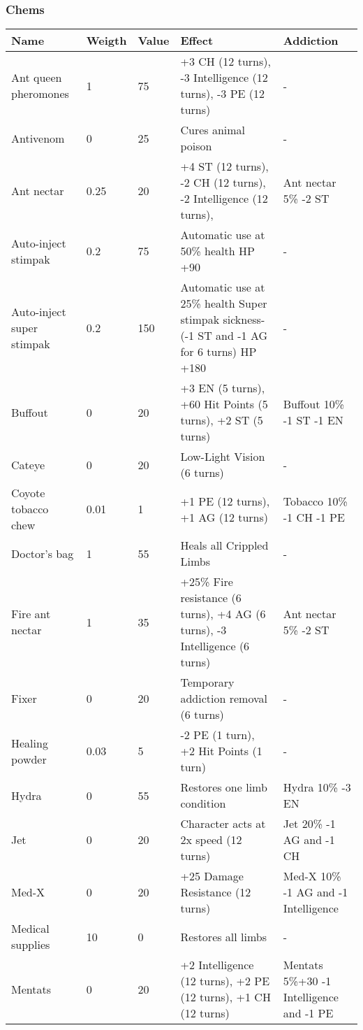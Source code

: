 
\subsubsection{Chems}
\begin{longtable}{|p{4cm}|p{1.2cm}|p{1.2cm}|p{4cm}|p{4cm}|}
\hline
\bfseries Name & \bfseries Weigth & \bfseries Value & \bfseries Effect & \bfseries Addiction \\
\hline
\endhead
Ant queen pheromones & 1 & 75 & +3 CH (12 turns), -3 Intelligence (12 turns), -3 PE (12 turns) & - \\
Antivenom & 0 & 25 & Cures animal poison & - \\
Ant nectar & 0.25 & 20 & +4 ST (12 turns), -2 CH (12 turns), -2 Intelligence (12 turns), & Ant nectar 5\% -2 ST \\
Auto-inject stimpak & 0.2 & 75 & Automatic use at 50\% health HP +90 & - \\
Auto-inject super stimpak & 0.2 & 150 & Automatic use at 25\% health Super stimpak sickness- (-1 ST and -1 AG for 6 turns) HP +180 & - \\
Buffout & 0 & 20 & +3 EN (5 turns), +60 Hit Points (5 turns), +2 ST (5 turns) & Buffout 10\% -1 ST -1 EN \\
Cateye & 0 & 20 & Low-Light Vision (6 turns) & - \\
Coyote tobacco chew & 0.01 & 1 & +1 PE (12 turns), +1 AG (12 turns) & Tobacco 10\% -1 CH -1 PE\\
Doctor's bag & 1 & 55 & Heals all Crippled Limbs & - \\
Fire ant nectar & 1 & 35 & +25\% Fire resistance (6 turns), +4 AG (6 turns), -3 Intelligence (6 turns) & Ant nectar 5\% -2 ST \\
Fixer & 0 & 20 & Temporary addiction removal (6 turns) & - \\
Healing powder & 0.03 & 5 & -2 PE (1 turn), +2 Hit Points (1 turn) & - \\
Hydra & 0 & 55 & Restores one limb condition & Hydra 10\% -3 EN \\
Jet & 0 & 20 & Character acts at 2x speed (12 turns) & Jet 20\% -1 AG and -1 CH \\
Med-X & 0 & 20 & +25 Damage Resistance (12 turns) & Med-X 10\% -1 AG and -1 Intelligence \\
Medical supplies & 10 & 0 & Restores all limbs & - \\
Mentats & 0 & 20 & +2 Intelligence (12 turns), +2 PE (12 turns), +1 CH (12 turns) & Mentats 5\%+30 -1 Intelligence and -1 PE \\

\end{longtable}
